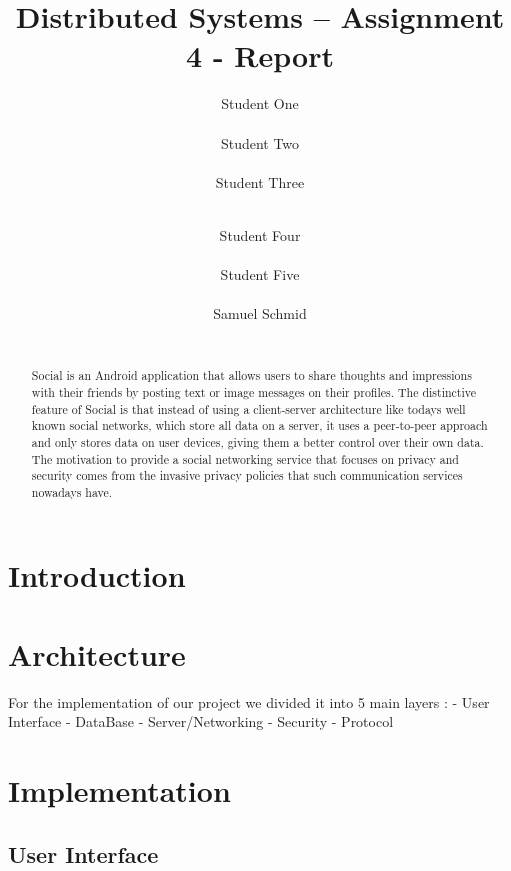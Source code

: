 \documentclass{report}
\title{Distributed Systems -- Assignment 4 - Report}
\author{
%
%
\alignauthor Student One\\
	\affaddr{ETH ID XX-XXX-XXX}\\
	\email{one@student.ethz.ch}
\alignauthor Student Two\\
	\affaddr{ETH ID XX-XXX-XXX}\\
	\email{two@student.ethz.ch}
\alignauthor Student Three\\
	\affaddr{ETH ID XX-XXX-XXX}\\
	\email{three@student.ethz.ch}
\and  %
\alignauthor Student Four\\
 	\affaddr{ETH ID XX-XXX-XXX}\\
 	\email{four@student.ethz.ch}
\alignauthor Student Five\\
 	\affaddr{ETH ID XX-XXX-XXX}\\
 	\email{five@student.ethz.ch}
\alignauthor Samuel Schmid\\
 	\affaddr{ETH ID 10-919-991}\\
 	\email{schmisam@student.ethz.ch}
}
\begin{document}
\maketitle

\begin{abstract}
Social is an Android application that allows users to share thoughts and impressions with their friends by posting text or image messages on their profiles.
The distinctive feature of Social is that instead of using a client-server architecture like todays well known social networks, which store all data on a server, it uses a peer-to-peer approach and only stores data on user devices, giving them a better control over their own data.
The motivation to provide a social networking service that focuses on privacy and security comes from the invasive privacy policies that such communication services nowadays have.
\end{abstract}

\section{Introduction}



\section{Architecture}

For the implementation of our project we divided it into 5 main layers : \newline
- User Interface \newline
- DataBase \newline
- Server/Networking \newline 
- Security \newline
- Protocol \newline



\section{Implementation}
\subsection{User Interface}
\end{document}
